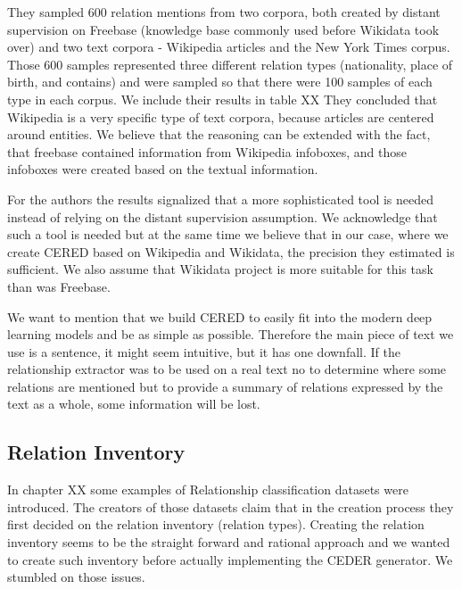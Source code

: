 They sampled 600 relation mentions from two corpora, both created by distant supervision on Freebase (knowledge base commonly used before Wikidata took over) and two text corpora - Wikipedia articles and the New York Times corpus. Those 600 samples represented three different relation types (nationality, place of birth, and contains) and were sampled so that there were 100 samples of each type in each corpus. We include their results in table XX  They concluded that Wikipedia is a very specific type of text corpora, because articles are centered around entities. We believe that the reasoning can be extended with the fact, that freebase contained information from Wikipedia infoboxes, and those infoboxes were created based on the textual information. 

For the authors the results signalized that a more sophisticated tool is needed instead of relying on the distant supervision assumption. We acknowledge that such a tool is needed but at the same time we believe that in our case, where we create CERED based on Wikipedia and Wikidata, the precision they estimated is sufficient. We also assume that Wikidata project is more suitable for this task than was Freebase.

We want to mention that we build CERED to easily fit into the modern deep learning models and be as simple as possible. Therefore the main piece of text we use is a sentence, it might seem intuitive, but it has one downfall. If the relationship extractor was to be used on a real text no to determine where some relations are mentioned but to provide a summary of relations expressed by the text as a whole, some information will be lost. 

\subsection{Relation Inventory}
In chapter XX some examples of Relationship classification datasets were introduced. The creators of those datasets claim that in the creation process they first decided on the relation inventory (relation types).  Creating the relation inventory seems to be the straight forward and rational approach and we wanted to create such inventory before actually implementing the CEDER generator. We stumbled on those issues.

